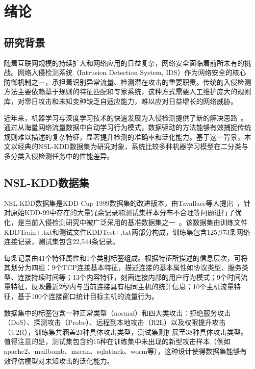 \section{绪论}

\subsection{研究背景}

随着互联网规模的持续扩大和网络应用的日益复杂，网络安全面临着前所未有的挑战。网络入侵检测系统（Intrusion Detection System, IDS）作为网络安全的核心防御机制之一，承担着识别异常流量、检测潜在攻击的重要职责。传统的入侵检测方法主要依赖基于规则的特征匹配和专家系统，这种方式需要人工维护庞大的规则库，对零日攻击和未知变种缺乏自适应能力，难以应对日益增长的网络威胁。

近年来，机器学习与深度学习技术的快速发展为入侵检测提供了新的解决思路~\cite{sharma2025machine,akuthota2025role}。通过从海量网络流量数据中自动学习行为模式，数据驱动的方法能够有效捕捉传统规则难以描述的复杂特征，显著提升检测的准确率和泛化能力。基于这一背景，本文以经典的NSL-KDD数据集为研究对象，系统比较多种机器学习模型在二分类与多分类入侵检测任务中的性能差异。

\subsection{NSL-KDD数据集}

NSL-KDD数据集是KDD Cup 1999数据集的改进版本，由Tavallaee等人提出~\cite{tavallaee2009}，针对原始KDD-99中存在的大量冗余记录和测试集样本分布不合理等问题进行了优化，是当前入侵检测研究中被广泛采用的基准数据集之一~\cite{rehman2025systematic}。该数据集由训练文件KDDTrain+.txt和测试文件KDDTest+.txt两部分构成，训练集包含125,973条网络连接记录，测试集包含22,544条记录。

每条记录由41个特征属性和1个类别标签组成。根据特征所描述的信息层次，可将其划分为四组：9个TCP连接基本特征，描述连接的基本属性如协议类型、服务类型、连接持续时间等；13个内容特征，刻画连接内部的用户行为模式；9个时间流量特征，反映最近2秒内与当前连接具有相同主机的统计信息；10个主机流量特征，基于100个连接窗口统计目标主机的流量行为。

数据集中的标签包含一种正常类型（normal）和四大类攻击：拒绝服务攻击（DoS）、探测攻击（Probe）、远程到本地攻击（R2L）以及权限提升攻击（U2R），训练集共涵盖23种具体攻击类型，测试集则扩展至38种具体攻击类型。值得注意的是，测试集包含约15种在训练集中未出现的新型攻击样本（例如apache2、mailbomb、mscan、sqlattack、worm等），这种设计使得数据集能够有效评估模型对未知攻击的泛化能力。


